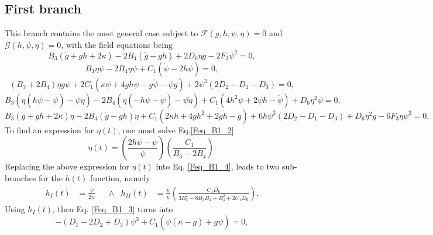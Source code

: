 \subsection{First branch}
\label{sec:first_branch}

This branch contains the most general case subject to $\mathcal{F}(g,h,\psi,\eta) = 0$ and $\mathcal{G}(h,\psi,\eta) = 0$, with the field equations being
\begin{dmath}
    \label{Feq_B1_1}
    B_3\left(\dot{g} + gh + 2\kappa\right) - 2B_4\left(\dot{g} - gh\right) + 2D_6\eta g - 2F_3\psi^2 = 0,
\end{dmath}
\begin{dmath}
    \label{Feq_B1_2}
    B_3\eta\psi -2B_4\eta\psi + C_1\left(\dot{\psi} - 2h\psi\right) = 0,
\end{dmath}
\begin{dmath}
    \label{Feq_B1_3}
    \left(B_3 + 2B_4\right)\eta g\psi + 2C_1\left(\kappa\psi + 4gh\psi - g\dot{\psi} - \psi\dot{g}\right) + 2\psi^3\left(2D_2 - D_1 - D_3\right) = 0,
\end{dmath}
\begin{dmath}
    \label{Feq_B1_4}
    B_3\left(\eta\left(h\psi - \dot{\psi}\right) -\psi\dot{\eta}\right) - 2B_4\left(\eta\left(-h\psi - \dot{\psi}\right) -\psi\dot{\eta}\right) 
    + C_1\left(4h^2\psi + 2\psi\dot{h} -\ddot{\psi}\right) + D_6\eta^2\psi = 0,
\end{dmath}
\begin{dmath}
    \label{Feq_B1_5}
    B_3\left(\dot{g} + gh + 2\kappa\right)\eta - 2B_4\left(\dot{g} - gh\right)\eta + C_1\left(2\kappa h + 4gh^2 + 2g\dot{h} - \ddot{g}\right) +
    6h\psi^2\left(2D_2 - D_1 - D_3\right) + D_6 \eta^2 g - 6F_3\eta\psi^2 = 0.
\end{dmath}
To find an expression for $\eta(t)$, one must solve Eq.\eqref{Feq_B1_2} 
\begin{equation}
    \label{B1_eta}
    \eta(t) = \left(\frac{2h\psi - \dot{\psi}}{\psi}\right)\left(\frac{C_1}{B_3 - 2B_4}\right).
\end{equation}
Replacing the above expression for $\eta(t)$ into Eq. \eqref{Feq_B1_4}, leads to two sub-branches for the $h(t)$ function, namely
\begin{align}
    \label{B1_h}
    h_I(t) & = \frac{\dot{\psi}}{2\psi} & & \wedge &  h_{II}(t) & = \frac{\dot{\psi}}{\psi}\left(\frac{C_1 D_6}{3B_3^2 - 8B_3B_4 + B_4^2 + 2C_1D_6}\right).
\end{align}
Using $h_I(t)$, then Eq. \eqref{Feq_B1_3} turns into
\begin{equation}
    -\left(D_1 - 2D_2 + D_3\right)\psi^3 + C_1\left(\psi\left(\kappa - \dot{g}\right) + g\dot{\psi}\right) = 0,
\end{equation}
